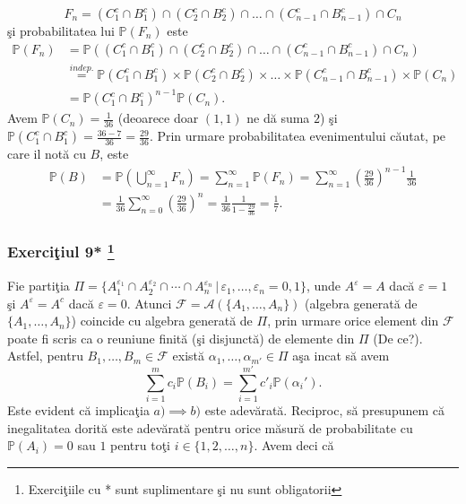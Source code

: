 \documentclass[]{article}
\def\a{{\alpha}}
\def\e{{\varepsilon}}
\def\PP{{\mathbb P}}
\def\MA{{\mathcal A}}
\def\MF{{\mathcal F}}
\let\rmarkdownfootnote\footnote%
\def\footnote{\protect\rmarkdownfootnote}
\begin{document}
\begin{enumerate}
    \begin{equation*}
        F_n = (C_1^c\cap B_1^c)\cap(C_2^c\cap B_2^c)\cap\dots\cap(C_{n-1}^c\cap B_{n-1}^c)\cap C_n
    \end{equation*}
\c si probabilitatea lui $\PP(F_n)$ este
    \begin{align*}
        \PP(F_n) &= \PP((C_1^c\cap B_1^c)\cap(C_2^c\cap B_2^c)\cap\dots\cap(C_{n-1}^c\cap B_{n-1}^c)\cap C_n)\\
                 &\overset{indep.}{=} \PP(C_1^c\cap B_1^c)\times \PP(C_2^c\cap B_2^c)\times\dots\times \PP(C_{n-1}^c\cap B_{n-1}^c)\times \PP(C_n)\\
                 &= \PP(C_1^c\cap B_1^c)^{n-1}\PP(C_n).
    \end{align*}
Avem $\PP(C_n) = \frac{1}{36}$ (deoarece doar $(1,1)$ ne d\u a suma $2$) \c si $\PP(C_1^c\cap B_1^c) = \frac{36-7}{36} = \frac{29}{36}$. Prin urmare probabilitatea evenimentului c\u autat, pe care il not\u a cu $B$, este
\begin{align*}
    \PP(B) &= \displaystyle\PP\left(\bigcup_{n=1}^{\infty}F_n\right)=\sum_{n=1}^{\infty}\PP(F_n)=\sum_{n=1}^{\infty}\left(\frac{29}{36}\right)^{n-1}\frac{1}{36}\\
            &= \frac{1}{36}\sum_{n=0}^{\infty}\left(\frac{29}{36}\right)^{n} = \frac{1}{36}\frac{1}{1-\frac{29}{36}}=\frac{1}{7}.
\end{align*}
\end{enumerate}

\subsubsection[Exerci\c tiul 9*
\label{Ex6}]{\texorpdfstring{Exerci\c tiul 9* \footnote{Exerci\c tiile
  cu * sunt suplimentare \c si nu sunt obligatorii}
\label{Ex6}}{Exerciiul 9*  }}\label{exerciiul-9}

Fie parti\c tia
\(\Pi=\{A_1^{\e_1}\cap A_2^{\e_2}\cap\cdots\cap A_n^{\e_n}\,|\,\e_1,\dots,\e_n=0,1\}\),
unde \(A^{\e}=A\) dac\u a \(\e=1\) \c si \(A^{\e}=A^c\) dac\u a
\(\e = 0\). Atunci \(\MF=\MA(\{A_1,\dots, A_n\})\) (algebra generat\u a
de \(\{A_1,\dots,A_n\}\)) coincide cu algebra generat\u a de \(\Pi\),
prin urmare orice element din \(\MF\) poate fi scris ca o reuniune
finit\u a (\c si disjunct\u a) de elemente din \(\Pi\) (De ce?). Astfel,
pentru \(B_1, \dots, B_m\in\MF\) exist\u a \(\a_1,\dots,\a_{m'}\in\Pi\)
a\c sa incat s\u a avem \[
  \displaystyle\sum_{i=1}^{m}c_i\PP(B_i)=\sum_{i=1}^{m'}c'_{i}\PP(\a_i').
\] Este evident c\u a implica\c tia \(a)\implies b)\) este
adev\u arat\u a. Reciproc, s\u a presupunem c\u a inegalitatea dorit\u a
este adev\u arat\u a pentru orice m\u asur\u a de probabilitate cu
\(\PP(A_i)=0\) sau \(1\) pentru to\c ti \(i\in\{1,2,\dots,n\}\). Avem
deci c\u a
\end{document}
